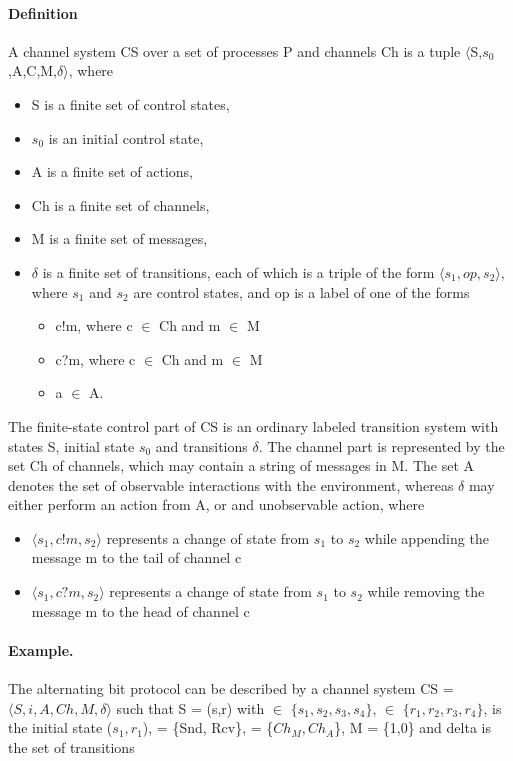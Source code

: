 \paragraph{Definition}
\label{CS}
A channel system CS over a set of processes P and channels Ch is a tuple $\langle$S,$s_0$,A,C,M,$\delta$$\rangle$, where 
\begin{itemize}
\item[]
S is a finite set of control states,
\item[]
$s_0$ is an initial control state,
\item[]
A is a finite set of actions,
\item[]
Ch is a finite set of channels,
\item[]
M is a finite set of messages,
\item[]
$\delta$ is a finite set of transitions, each of which is a triple of the form $\langle s_1,op,s_2\rangle$, where $s_1$ and $s_2$ are control states, and op is a label of one of the forms

\begin{itemize}
\item
c!m, where c $\in$ Ch and m $\in$ M
\item
c?m, where c $\in$ Ch and m $\in$ M
\item
a $\in$ A.
\end{itemize}
\end{itemize}

The finite-state control part of CS is an ordinary labeled transition system with states S, initial state $s_0$ and transitions $\delta$. The channel part is represented by the set Ch of channels, which may contain a string of messages in M. The set A denotes the set of observable interactions with the environment, whereas $\delta$ may either perform an action from A, or and unobservable action, where

\begin{itemize}
\item[]
$\langle s_1, c!m, s_2\rangle$ represents a change of state from $s_1$ to $s_2$ while appending the message m to the tail of channel c
\item[]
$\langle s_1, c?m, s_2\rangle$ represents a change of state from $s_1$ to $s_2$ while removing the message m to the head of channel c
\end{itemize}

\paragraph{Example.} The alternating bit protocol can be described by a channel system CS = $\langle S,i,A,Ch,M,\delta\rangle$ such that S = {(s,r)} with  $\in$ $\{s_1,s_2,s_3,s_4\}$,  $\in$ $\{r_1,r_2,r_3,r_4\}$,  is the initial state ($s_1,r_1$),  = \{Snd, Rcv\},  = \{$Ch_M,Ch_A$\}, M = \{1,0\} and delta is the set of transitions

